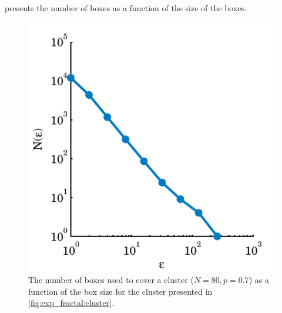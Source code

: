  presents the number of boxes as a function of the size of the boxes. 

\begin{figure}
	\centering
	\includegraphics[width=1\columnwidth]{./img/assignment_fractal_numboxesVSboxsize}
	\caption{The number of boxes used to cover a cluster ($N = 80, p = 0.7$) as a function of the box size for the cluster presented in \cref{fig:exp_fractal:cluster}.}
	\label{fig:exp_fractal:minkowskiDimension}
\end{figure}


